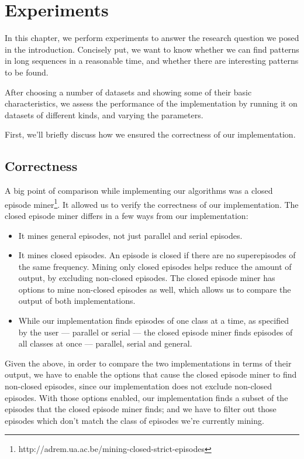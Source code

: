 \chapter{Experiments}
\label{sec:experiments}

In this chapter, we perform experiments to answer the research question we posed in the introduction. Concisely put, we want to know whether we can find patterns in long sequences in a reasonable time, and whether there are interesting patterns to be found.

After choosing a number of datasets and showing some of their basic characteristics, we assess the performance of the implementation by running it on datasets of different kinds, and varying the parameters.

First, we'll briefly discuss how we ensured the correctness of our implementation.

\section{Correctness}
\label{sec:experiments-correctness}

A big point of comparison while implementing our algorithms was a closed episode miner\footnote{http://adrem.ua.ac.be/mining-closed-strict-episodes}. It allowed us to verify the correctness of our implementation. The closed episode miner differs in a few ways from our implementation:

\begin{itemize}
\item It mines general episodes, not just parallel and serial episodes.
\item It mines closed episodes. An episode is closed if there are no superepisodes of the same frequency. Mining only closed episodes helps reduce the amount of output, by excluding non-closed episodes. The closed episode miner has options to mine non-closed episodes as well, which allows us to compare the output of both implementations.
\item While our implementation finds episodes of one class at a time, as specified by the user --- parallel or serial --- the closed episode miner finds episodes of all classes at once --- parallel, serial and general.
\end{itemize}

Given the above, in order to compare the two implementations in terms of their output, we have to enable the options that cause the closed episode miner to find non-closed episodes, since our implementation does not exclude non-closed episodes. With those options enabled, our implementation finds a subset of the episodes that the closed episode miner finds; and we have to filter out those episodes which don't match the class of episodes we're currently mining.

